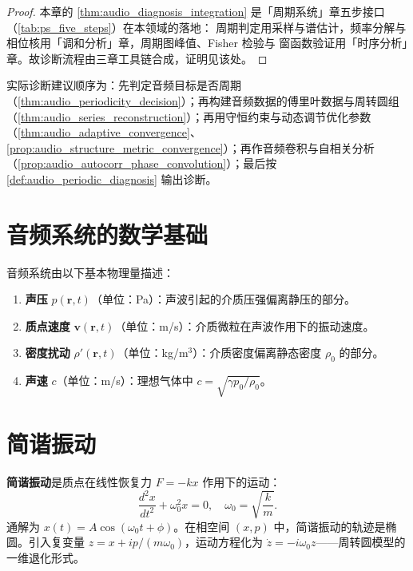 \begin{proof}
本章的 \cref{thm:audio_diagnosis_integration} 是「周期系统」章五步接口（\cref{tab:ps_five_steps}）在本领域的落地：
周期判定用采样与谱估计，频率分解与相位核用「调和分析」章，周期图峰值、Fisher 检验与
窗函数验证用「时序分析」章。故诊断流程由三章工具链合成，证明见该处。
\end{proof}

\begin{remark}[整合后的操作顺序]\label{rem:audio_integration_order}
实际诊断建议顺序为：先判定音频目标是否周期（\cref{thm:audio_periodicity_decision}）；再构建音频数据的傅里叶数据与周转圆组（\cref{thm:audio_series_reconstruction}）；再用守恒约束与动态调节优化参数（\cref{thm:audio_adaptive_convergence}、\cref{prop:audio_structure_metric_convergence}）；再作音频卷积与自相关分析（\cref{prop:audio_autocorr_phase_convolution}）；最后按 \cref{def:audio_periodic_diagnosis} 输出诊断。
\end{remark}

\section{音频系统的数学基础}

\begin{definition}[声波的基本量]\label{def:acoustic_quantities}
音频系统由以下基本物理量描述：
\begin{enumerate}[label=(\roman*)]
    \item \textbf{声压} $p(\mathbf{r}, t)$（单位：Pa）：声波引起的介质压强偏离静压的部分。
    \item \textbf{质点速度} $\mathbf{v}(\mathbf{r}, t)$（单位：m/s）：介质微粒在声波作用下的振动速度。
    \item \textbf{密度扰动} $\rho'(\mathbf{r}, t)$（单位：kg/m$^3$）：介质密度偏离静态密度 $\rho_0$ 的部分。
    \item \textbf{声速} $c$（单位：m/s）：理想气体中 $c = \sqrt{\gamma p_0/\rho_0}$。
\end{enumerate}
\end{definition}

\section{简谐振动}

\begin{definition}[简谐振动]\label{def:simple_harmonic_motion}
\textbf{简谐振动}是质点在线性恢复力 $F = -kx$ 作用下的运动：
\[
\frac{d^2 x}{dt^2} + \omega_0^2 x = 0, \quad \omega_0 = \sqrt{\frac{k}{m}}.
\]
通解为 $x(t) = A\cos(\omega_0 t + \phi)$。在相空间 $(x, p)$ 中，简谐振动的轨迹是椭圆。引入复变量 $z = x + i p/(m\omega_0)$，运动方程化为 $\dot{z} = -i\omega_0 z$——周转圆模型的一维退化形式。
\end{definition}

